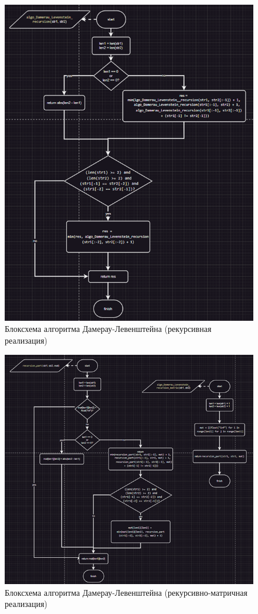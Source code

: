 \documentclass[a4paper,12pt]{article}
\begin{document}
\begin{figure}[H]
    \centering
    \includegraphics[width=1\textwidth]{block_2_2.png}
    \caption{Блоксхема алгоритма Дамерау-Левенштейна (рекурсивная реализация)}
\end{figure}
\begin{figure}[H]
    \centering
    \includegraphics[width=1\textwidth]{block_2_3.png}
    \caption{Блоксхема алгоритма Дамерау-Левенштейна (рекурсивно-матричная реализация)}
\end{figure}
\newpage
\end{document}
